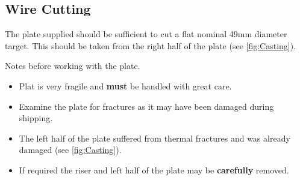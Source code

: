 \subsection{Wire Cutting}
The plate supplied should be sufficient to cut a flat nominal 49mm diameter target. This should be taken from the right half of the plate (see \ref{fig:Casting}). 

Notes before working with the plate.
\begin{itemize}
\item Plat is very fragile and \textbf{must} be handled with great care. 
\item Examine the plate for fractures as it may have been damaged during shipping. 
\item The left half of the plate suffered from thermal fractures and was already damaged (see \ref{fig:Casting}). 
\item If required the riser and left half of the plate may be \textbf{carefully} removed.
\end{itemize}